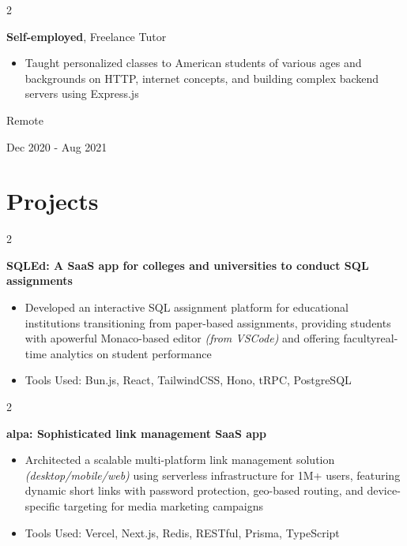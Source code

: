 \documentclass[10pt, letterpaper]{article}
\newenvironment{highlights}{
    \begin{itemize}[
        topsep=0.10 cm,
        parsep=0.10 cm,
        partopsep=0pt,
        itemsep=0pt,
        leftmargin=0.4 cm + 10pt
    ]
}{
    \end{itemize}
} %
\newenvironment{twocolentry}[2][]{
    \onecolentry
    \def\secondColumn{#2}
    \setcolumnwidth{\fill, 4.5 cm}
    \begin{paracol}{2}
}{
    \switchcolumn \raggedleft \secondColumn
    \end{paracol}
    \endonecolentry
} %
\let\hrefWithoutArrow\href
\renewcommand{\href}[2]{\hrefWithoutArrow{#1}{\ifthenelse{\equal{#2}{}}{ }{#2 }\raisebox{.15ex}{\footnotesize \faExternalLink*}}}
\begin{document}
        \vspace{0.2 cm}
        \begin{twocolentry}{
            Remote

        Dec 2020 - Aug 2021
        }
            \textbf{Self-employed}, Freelance Tutor
            \begin{highlights}
                \item Taught personalized classes to American students of various ages and backgrounds on HTTP, internet concepts, and building complex backend servers using Express.js
            \end{highlights}
        \end{twocolentry}
    \section{Projects}
        \begin{twocolentry}{
        }
            \textbf{SQLEd: A SaaS app for colleges and universities to conduct SQL assignments}
            \begin{highlights}
                \item Developed an interactive SQL assignment platform for educational institutions transitioning from paper-based assignments, providing students with a\newline powerful Monaco-based editor \textit{(from VSCode)} and offering faculty\newline real-time analytics on student performance
                \item Tools Used: Bun.js, React, TailwindCSS, Hono, tRPC, PostgreSQL
            \end{highlights}
        \end{twocolentry}
        \vspace{0.2 cm}
        \begin{twocolentry}{
        }
            \textbf{alpa: Sophisticated link management SaaS app}
            \begin{highlights}
                \item Architected a scalable multi-platform link management solution \textit{(desktop/mobile/web)} using serverless infrastructure for 1M+ users, featuring dynamic short links with password protection, geo-based routing, and device-specific targeting for media marketing campaigns
                \item Tools Used: Vercel, Next.js, Redis, RESTful, Prisma, TypeScript
            \end{highlights}
        \end{twocolentry}
        \vspace{0.2 cm}
\end{document}
